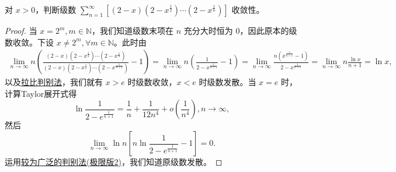 \documentclass[../../main.tex]{subfiles}%
\begin{document}
\begin{example}
对 \( x > 0 \)，判断级数 \( \sum_{n = 1}^{\infty} \left[ (2 - x) \left( 2 - x^{\frac{1}{2}} \right) \cdots \left( 2 - x^{\frac{1}{n}} \right) \right] \) 收敛性。
\end{example}
\begin{proof}

当 \( x = 2^m, m \in \mathbb{N} \)，我们知道级数末项在 \( n \) 充分大时恒为 0，因此原本的级数收敛。下设 \( x \neq 2^m, \forall m \in \mathbb{N} \)。此时由
\begin{align*}
\lim_{n \to \infty} n \left( \frac{(2 - x) \left( 2 - x^{\frac{1}{2}} \right) \cdots \left( 2 - x^{\frac{1}{n}} \right)}{(2 - x) \left( 2 - x^{\frac{1}{2}} \right) \cdots \left( 2 - x^{\frac{1}{n + 1}} \right)} - 1 \right) = \lim_{n \to \infty} n \left( \frac{1}{2 - x^{\frac{1}{n + 1}}} - 1 \right)= \lim_{n \to \infty} \frac{n \left( x^{\frac{1}{n + 1}} - 1 \right)}{2 - x^{\frac{1}{n + 1}}} = \lim_{n \to \infty} n \frac{\ln x}{n + 1} = \ln x,
\end{align*}
以及\hyperref[theorem:拉比判别法]{拉比判别法}，我们就有 \( x > e \) 时级数收敛，\( x < e \) 时级数发散。当 \( x = e \) 时，计算Taylor展开式得
\[
\ln \frac{1}{2 - e^{\frac{1}{n + 1}}} = \frac{1}{n} + \frac{1}{12 n^4} + o \left( \frac{1}{n^4} \right), n \to \infty,
\]
然后
\[
\lim_{n \to \infty} \ln n \left[ n \ln \frac{1}{2 - e^{\frac{1}{n + 1}}} - 1 \right] = 0.
\]
运用\hyperref[theorem:较为广泛的判别法]{较为广泛的判别法(极限版2)}，我们知道原级数发散。

\end{proof}
\end{document}
